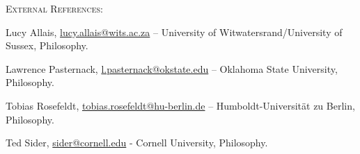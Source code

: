 \documentclass[11pt]{article}
\begin{document}
\medskip

\ind \textsc{External References:}
\medskip

\noindent Lucy Allais, \href{mailto:lucy.allais@wits.ac.za}{lucy.allais@wits.ac.za} – University of Witwatersrand/University of Sussex, Philosophy.

\noindent Lawrence Pasternack, \href{mailto:l.pasternack@okstate.edu}{l.pasternack@okstate.edu} – Oklahoma State University, Philosophy. 

\noindent Tobias Rosefeldt, \href{mailto:tobias.rosefeldt@hu-berlin.de}{tobias.rosefeldt@hu-berlin.de} – Humboldt-Universität zu Berlin, Philosophy.

\noindent Ted Sider, \href{mailto:sider@cornell.edu}{sider@cornell.edu} - Cornell University, Philosophy.
\end{document}
